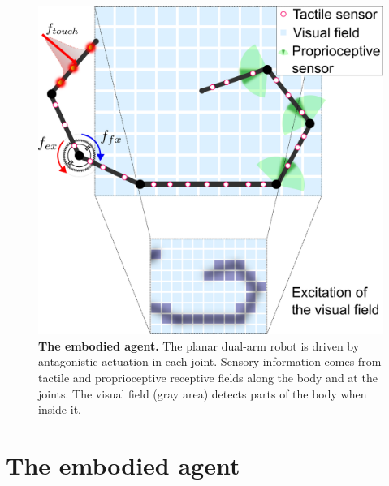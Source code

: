 \documentclass[letterpaper, 10 pt, conference]{ieeeconf}  %
\begin{document}
\begin{figure}[!t]
	\begin{center}
		\hspace*{\fill}
		\includegraphics[width=0.99\columnwidth]{extended_planar_dual_arm_with_vision_v2.png}
		\hspace*{\fill}
	\end{center}
	\caption{\label{fig:extended_dual_arm_robot} \textbf{The embodied agent.} The planar dual-arm robot is driven by antagonistic actuation in each joint. Sensory information comes from tactile and proprioceptive receptive fields along the body and at the joints. The visual field (gray area) detects parts of the body when inside it.}
    \vspace{-20pt}
\end{figure}
\section{The embodied agent}\label{sec:the_embodied_agent}
\end{document}
